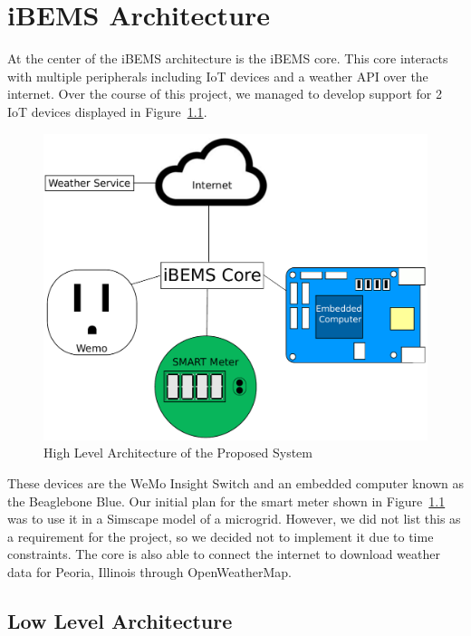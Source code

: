 \chapter{iBEMS Architecture}
\label{ch: Chapter2}


At the center of the iBEMS architecture is the iBEMS core. This core interacts
with multiple peripherals including IoT devices and a weather API over the
internet. Over the course of this project, we managed to develop support for 2
IoT devices displayed in Figure~\ref{fig:highLevelArchitecture}. %
%
\begin{figure}
  \centering
  \includegraphics[scale=0.3]{figs/highLevelArchitecture.pdf}
  \caption{High Level Architecture of the Proposed System}
  \label{fig:highLevelArchitecture}
\end{figure}
%
These devices are the WeMo Insight Switch and an embedded computer known as the Beaglebone
Blue. Our initial plan for the smart meter shown in
Figure~\ref{fig:highLevelArchitecture} was to use it in a Simscape model of a
microgrid. However, we did not list this as a requirement for the project, so we
decided not to implement it due to time constraints. The core is also able to
connect the internet to download weather data for Peoria, Illinois through
OpenWeatherMap.

\section{Low Level Architecture}

